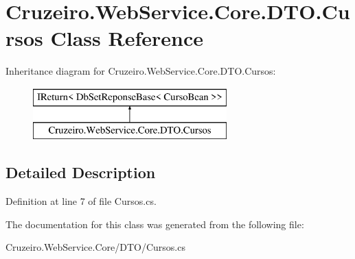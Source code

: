 \hypertarget{class_cruzeiro_1_1_web_service_1_1_core_1_1_d_t_o_1_1_cursos}{}\section{Cruzeiro.\+Web\+Service.\+Core.\+D\+T\+O.\+Cursos Class Reference}
\label{class_cruzeiro_1_1_web_service_1_1_core_1_1_d_t_o_1_1_cursos}
Inheritance diagram for Cruzeiro.\+Web\+Service.\+Core.\+D\+T\+O.\+Cursos\+:\begin{figure}[H]
\begin{center}
\leavevmode
\includegraphics[height=2.000000cm]{class_cruzeiro_1_1_web_service_1_1_core_1_1_d_t_o_1_1_cursos}
\end{center}
\end{figure}


\subsection{Detailed Description}


Definition at line 7 of file Cursos.\+cs.



The documentation for this class was generated from the following file\+:\begin{DoxyCompactItemize}
\item 
Cruzeiro.\+Web\+Service.\+Core/\+D\+T\+O/Cursos.\+cs\end{DoxyCompactItemize}
